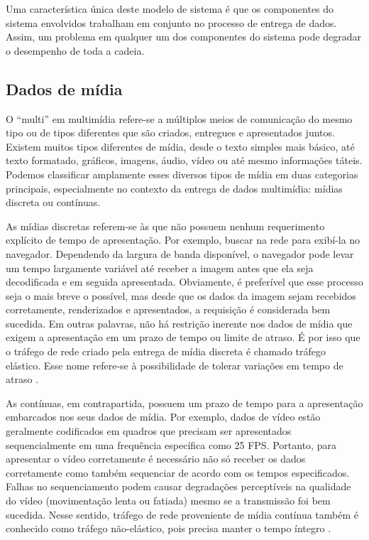 \documentclass[12pt, %
openright, 
oneside, %
a4paper,    %
brazil]{facom-ufu-abntex2}
\begin{document}
Uma característica única deste modelo de sistema é que os componentes do
sistema envolvidos trabalham em conjunto no processo de entrega de dados.
Assim, um problema em qualquer um dos componentes do sistema pode degradar o
desempenho de toda a cadeia.

\subsection{Dados de mídia}

O ``multi'' em multimídia refere-se a múltiplos meios de comunicação do mesmo
tipo ou de tipos diferentes que são criados, entregues e apresentados juntos.
Existem muitos tipos diferentes de mídia, desde o texto simples mais básico,
até texto formatado, gráficos, imagens, áudio, vídeo ou até mesmo informações
táteis. Podemos classificar amplamente esses diversos tipos de mídia em duas
categorias principais, especialmente no contexto da entrega de dados
multimídia: mídias discreta ou contínuas.

As mídias discretas referem-se às que não possuem nenhum requerimento explícito
de tempo de apresentação. Por exemplo, buscar na rede para exibí-la no
navegador. Dependendo da largura de banda disponível, o navegador pode levar um
tempo largamente variável até receber a imagem antes que ela seja decodificada
e em seguida apresentada. Obviamente, é preferível que esse processo seja o
mais breve o possível, mas desde que os dados da imagem sejam recebidos
corretamente, renderizados e apresentados, a requisição é considerada bem
sucedida. Em outras palavras, não há restrição inerente nos dados de mídia que
exigem a apresentação em um prazo de tempo ou limite de atraso. É por isso que
o tráfego de rede criado pela entrega de mídia discreta é chamado tráfego
elástico. Esse nome refere-se à possibilidade de tolerar variações em tempo de
atraso \cite{lee2005scalable}.

As contínuas, em contrapartida, possuem um prazo de tempo para a apresentação
embarcados nos seus dados de mídia. Por exemplo, dados de vídeo estão
geralmente codificados em quadros que precisam ser apresentados sequencialmente
em uma frequência específica como 25 FPS. Portanto, para apresentar o vídeo
corretamente é necessário não só receber os dados corretamente como também
sequenciar de acordo com os tempos especificados. Falhas no sequenciamento
podem causar degradações perceptíveis na qualidade do vídeo (movimentação lenta
ou fatiada) mesmo se a transmissão foi bem sucedida. Nesse sentido, tráfego de
rede proveniente de mídia contínua também é conhecido como tráfego
não-elástico, pois precisa manter o tempo íntegro \cite{lee2005scalable}.
\end{document}
